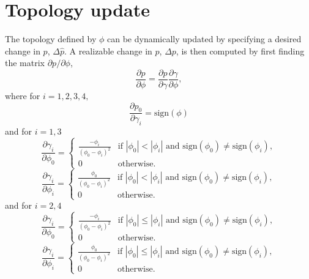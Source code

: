 \documentclass{article}
\begin{document}
\section{Topology update}
The topology defined by $\phi$ can be dynamically updated by specifying a desired change in $p$, $\Delta \hat{p}$. A realizable change in $p$, $\Delta p$, is then computed by first finding the matrix $\partial p / \partial \phi$, 
\begin{equation}
    \frac{\partial p}{\partial \phi} = 
    \frac{\partial p}{\partial \gamma} \frac{\partial \gamma}{\partial \phi},
\end{equation}
where for $i = 1,2,3,4,$
\begin{equation}
    \frac{\partial p_0}{\partial \gamma_i} = 
        \text{sign}(\phi) 
\end{equation}
and for $i = 1,3$
\begin{equation}
    \frac{\partial \gamma_i}{\partial \phi_0} = 
    \begin{cases}
        \frac{-\phi_i}{(\phi_0 - \phi_i)^2} & 
            \text{if } |\phi_0| < |\phi_i| \text{ and } 
            \text{sign}(\phi_0) \ne \text{sign}(\phi_i), \\
        0 & \text{otherwise.}
    \end{cases}
\end{equation}
\begin{equation}
    \frac{\partial \gamma_i}{\partial \phi_i} = 
    \begin{cases}
        \frac{\phi_0}{(\phi_0 - \phi_i)^2} & 
            \text{if } |\phi_0| < |\phi_i| \text{ and } 
            \text{sign}(\phi_0) \ne \text{sign}(\phi_i), \\
        0 & \text{otherwise.}
    \end{cases}
\end{equation}
and for $i = 2,4$
\begin{equation}
    \frac{\partial \gamma_i}{\partial \phi_0} = 
    \begin{cases}
        \frac{-\phi_i}{(\phi_0 - \phi_i)^2} & 
            \text{if } |\phi_0| \le |\phi_i| \text{ and } 
            \text{sign}(\phi_0) \ne \text{sign}(\phi_i), \\
        0 & \text{otherwise.}
    \end{cases}
\end{equation}
\begin{equation}
    \frac{\partial \gamma_i}{\partial \phi_i} = 
    \begin{cases}
        \frac{\phi_0}{(\phi_0 - \phi_i)^2} & 
            \text{if } |\phi_0| \le |\phi_i| \text{ and } 
            \text{sign}(\phi_0) \ne \text{sign}(\phi_i), \\
        0 & \text{otherwise.}
    \end{cases}
\end{equation}
\end{document}
